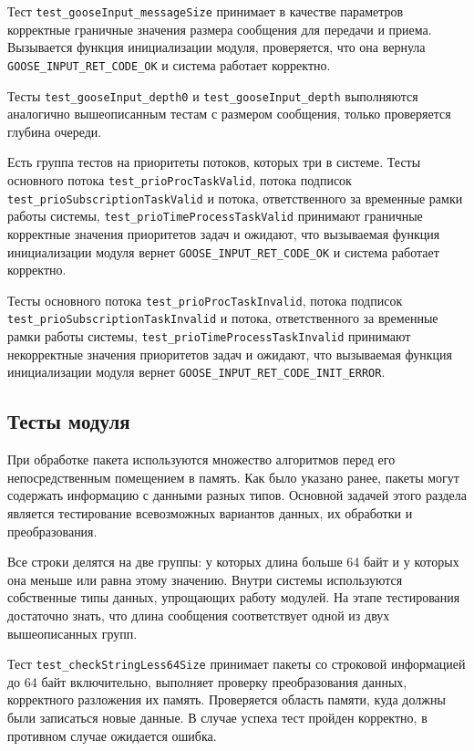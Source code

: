 Тест \lstinline{test_gooseInput_messageSize} принимает в качестве параметров корректные граничные значения размера сообщения для передачи и приема. Вызывается функция инициализации модуля, проверяется, что она вернула \lstinline{GOOSE_INPUT_RET_CODE_OK} и система работает корректно.

Тесты \lstinline{test_gooseInput_depth0} и \lstinline{test_gooseInput_depth} выполняются аналогично вышеописанным тестам с размером сообщения, только проверяется глубина очереди.

Есть группа тестов на приоритеты потоков, которых три в системе. Тесты основного потока \lstinline{test_prioProcTaskValid}, потока подписок \lstinline{test_prioSubscriptionTaskValid} и потока, ответственного за временные рамки работы системы, \lstinline{test_prioTimeProcessTaskValid} принимают граничные корректные значения приоритетов задач и ожидают, что вызываемая функция инициализации модуля вернет \lstinline{GOOSE_INPUT_RET_CODE_OK} и система работает корректно.

Тесты основного потока \lstinline{test_prioProcTaskInvalid}, потока подписок  \lstinline{test_prioSubscriptionTaskInvalid} и потока, ответственного за временные рамки работы системы, \lstinline{test_prioTimeProcessTaskInvalid} принимают некорректные значения приоритетов задач и ожидают, что вызываемая функция инициализации модуля вернет \lstinline{GOOSE_INPUT_RET_CODE_INIT_ERROR}.

\subsection{Тесты модуля \moduleProcessPackets}

При обработке пакета используются множество алгоритмов перед его непосредственным помещением в память. Как было указано ранее, пакеты могут содержать информацию с данными разных типов. Основной задачей этого раздела является тестирование всевозможных вариантов данных, их обработки и преобразования.

Все строки делятся на две группы: у которых длина больше 64 байт и у которых она меньше или равна этому значению. Внутри системы используются собственные типы данных, упрощающих работу модулей. На этапе тестирования достаточно знать, что длина сообщения соответствует одной из двух вышеописанных групп.

Тест  \lstinline{test_checkStringLess64Size} принимает пакеты со строковой информацией до 64 байт включительно, выполняет проверку преобразования данных, корректного разложения их память. Проверяется область памяти, куда должны были записаться новые данные. В случае успеха тест пройден корректно, в противном случае ожидается ошибка.

